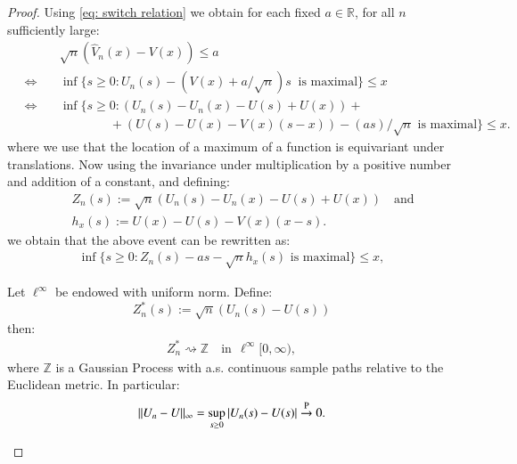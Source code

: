 \begin{proof}

Using \eqref{eq: switch relation} we obtain for each fixed $a \in \mathbb{R}$, for all $n$ sufficiently large:
\begin{align*}
    &\sqrt{n} \left( \hat{V}_n (x) - V(x) \right) \leq a \quad \\
     \quad \Leftrightarrow \quad  &\inf \big\{s \geq 0: U_n(s) - \left(V(x)+ a/\sqrt{n} \right) s \: \text { is maximal} \big\} \leq x \quad \quad \\
    \quad \Leftrightarrow \quad  &\inf \big\{s \geq 0: (U_n (s) - U_n(x) - U (s) + U(x) ) + \\
    & \quad \quad \quad \quad + (U(s) - U(x) - V(x)(s-x) ) -  (a s)/\sqrt{n}  \text { is maximal} \big\} \leq x. 
\end{align*}
where we use that the location of a maximum of a function is equivariant under translations. Now using the invariance under multiplication by a positive number and addition of a constant, and defining:
\begin{align}
    &Z_n(s) := \sqrt{n} (U_n (s) - U_n(x) - U (s) + U(x) ) \quad \text{and} 
    \\ \quad &h_x(s) := U(x) - U(s) - V(x)(x-s).
\end{align}
we obtain that the above event can be rewritten as:
\begin{align*}
    \inf \big\{s \geq 0: Z_n(s) - a s - \sqrt{n} h_x(s)  \text { is maximal} \big\} \leq x,
\end{align*}
\begin{lemma}\label{lemma: conv weak argmax}
Let $\ell^{\infty}$ be endowed with uniform norm. Define:
$$ Z^*_n(s) := \sqrt{n} \left( U_n(s) - U(s) \right) $$
then:
\begin{align}\label{eq: convergence ell^infty Z 1}
    Z^*_n \rightsquigarrow \mathbb{Z} \quad \text{in} \: \: \ell^{\infty}[0,\infty),
\end{align}    
where $\mathbb{Z}$ is a Gaussian Process with a.s. continuous sample paths relative to the Euclidean metric. In particular:
\begin{align}\label{eq: norm infinity convergence}
    \|U_n - U \|_{\infty} = \sup_{s\geq 0} |U_n(s)- U(s)| \stackrel{\pb}{\rightarrow} 0.

\end{align}
\end{lemma}
\end{proof}
